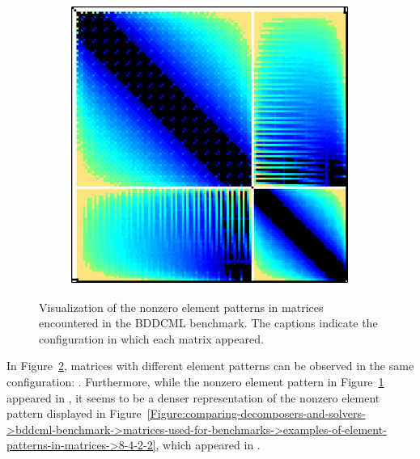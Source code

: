 \begin{figure}[ht!]
\begin{subfigure}[b]{0.48\textwidth}
		\includegraphics[width=\textwidth]{images/ch03/input-matrices/bddcml-benchmark/poc-32_4_2.pdf}
		\caption{}
		\label{Figure:comparing-decomposers-and-solvers->bddcml-benchmark->matrices-used-for-benchmarks->examples-of-element-patterns-in-matrices->32-4-2}
	\end{subfigure}
	
	\caption{Visualization of the nonzero element patterns in matrices encountered in the BDDCML benchmark.
		The captions indicate the configuration in which each matrix appeared.
	}
	\label{Figure:comparing-decomposers-and-solvers->bddcml-benchmark->matrices-used-for-benchmarks->examples-of-element-patterns-in-matrices}
\end{figure}

In Figure~\ref{Figure:comparing-decomposers-and-solvers->bddcml-benchmark->matrices-used-for-benchmarks->examples-of-element-patterns-in-matrices}, matrices with different element patterns can be observed in the same configuration: .
Furthermore, while the nonzero element pattern in Figure~\ref{Figure:comparing-decomposers-and-solvers->bddcml-benchmark->matrices-used-for-benchmarks->examples-of-element-patterns-in-matrices->32-4-2} appeared in , it seems to be a denser representation of the nonzero element pattern displayed in Figure~\ref{Figure:comparing-decomposers-and-solvers->bddcml-benchmark->matrices-used-for-benchmarks->examples-of-element-patterns-in-matrices->8-4-2-2}, which appeared in .



